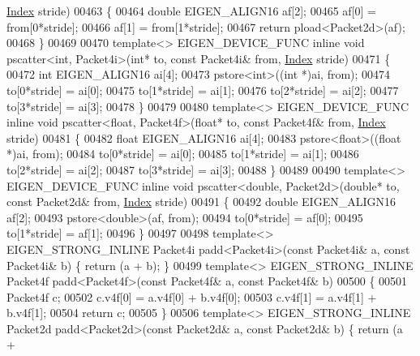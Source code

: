\begin{DoxyCode}
{      \hyperlink{namespace_eigen_a62e77e0933482dafde8fe197d9a2cfde}{Index} stride)
00463 \{
00464   \textcolor{keywordtype}{double} EIGEN\_ALIGN16 af[2];
00465   af[0] = from[0*stride];
00466   af[1] = from[1*stride];
00467  \textcolor{keywordflow}{return} pload<Packet2d>(af);
00468 \}
00469 
00470 \textcolor{keyword}{template}<> EIGEN\_DEVICE\_FUNC \textcolor{keyword}{inline} \textcolor{keywordtype}{void} pscatter<int, Packet4i>(\textcolor{keywordtype}{int}* to, \textcolor{keyword}{const} Packet4i& from, 
      \hyperlink{namespace_eigen_a62e77e0933482dafde8fe197d9a2cfde}{Index} stride)
00471 \{
00472   \textcolor{keywordtype}{int} EIGEN\_ALIGN16 ai[4];
00473   pstore<int>((\textcolor{keywordtype}{int} *)ai, from);
00474   to[0*stride] = ai[0];
00475   to[1*stride] = ai[1];
00476   to[2*stride] = ai[2];
00477   to[3*stride] = ai[3];
00478 \}
00479 
00480 \textcolor{keyword}{template}<> EIGEN\_DEVICE\_FUNC \textcolor{keyword}{inline} \textcolor{keywordtype}{void} pscatter<float, Packet4f>(\textcolor{keywordtype}{float}* to, \textcolor{keyword}{const} Packet4f& from, 
      \hyperlink{namespace_eigen_a62e77e0933482dafde8fe197d9a2cfde}{Index} stride)
00481 \{
00482   \textcolor{keywordtype}{float} EIGEN\_ALIGN16 ai[4];
00483   pstore<float>((\textcolor{keywordtype}{float} *)ai, from);
00484   to[0*stride] = ai[0];
00485   to[1*stride] = ai[1];
00486   to[2*stride] = ai[2];
00487   to[3*stride] = ai[3];
00488 \}
00489 
00490 \textcolor{keyword}{template}<> EIGEN\_DEVICE\_FUNC \textcolor{keyword}{inline} \textcolor{keywordtype}{void} pscatter<double, Packet2d>(\textcolor{keywordtype}{double}* to, \textcolor{keyword}{const} Packet2d& from, 
      \hyperlink{namespace_eigen_a62e77e0933482dafde8fe197d9a2cfde}{Index} stride)
00491 \{
00492   \textcolor{keywordtype}{double} EIGEN\_ALIGN16 af[2];
00493   pstore<double>(af, from);
00494   to[0*stride] = af[0];
00495   to[1*stride] = af[1];
00496 \}
00497 
00498 \textcolor{keyword}{template}<> EIGEN\_STRONG\_INLINE Packet4i padd<Packet4i>(\textcolor{keyword}{const} Packet4i& a, \textcolor{keyword}{const} Packet4i& b) \{ \textcolor{keywordflow}{return} (a + 
      b); \}
00499 \textcolor{keyword}{template}<> EIGEN\_STRONG\_INLINE Packet4f padd<Packet4f>(\textcolor{keyword}{const} Packet4f& a, \textcolor{keyword}{const} Packet4f& b)
00500 \{
00501   Packet4f c;
00502   c.v4f[0] = a.v4f[0] + b.v4f[0];
00503   c.v4f[1] = a.v4f[1] + b.v4f[1];
00504   \textcolor{keywordflow}{return} c;
00505 \}
00506 \textcolor{keyword}{template}<> EIGEN\_STRONG\_INLINE Packet2d padd<Packet2d>(\textcolor{keyword}{const} Packet2d& a, \textcolor{keyword}{const} Packet2d& b) \{ \textcolor{keywordflow}{return} (a + 
}
\end{DoxyCode}
